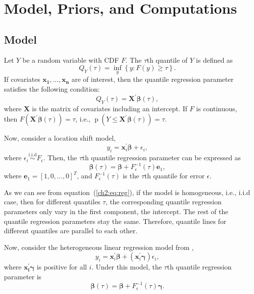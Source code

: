 \documentclass[12pt]{article}
\DeclareMathOperator{\pr}{p}
\begin{document}
\section{Model, Priors, and Computations}
\label{ch2:sec:model}
\subsection{Model}
Let $Y$ be a random variable with CDF $F$.  The $\tau$th quantile of
$Y$ is defined as
\begin{displaymath}
  Q_Y(\tau) = \underset{y}{\inf} \left\{ y: F(y) \ge \tau \right\}.
\end{displaymath}
If covariates $\bm{x_1, \ldots, x_n}$ are of interest, then the
quantile regression parameter satisfies the following condition:
\begin{displaymath}
  Q_Y(\tau) = \bm{X^\prime\beta}(\tau),
\end{displaymath}
where $\bm{X}$ is the matrix of covariates including an intercept.  If
$F$ is continuous, then $F(\bm{X^\prime\beta}(\tau)) = \tau$, i.e., $\pr(Y
\le \bm{X^\prime\beta}(\tau)) = \tau$.

Now, consider a location shift model,
\begin{displaymath}
  y_i = \bm{x}_i^{\prime}\bm{\beta} + \epsilon_i,
\end{displaymath}
where $\epsilon_i \stackrel{\mbox{i.i.d}}{\sim} F_{\epsilon}$. Then,
the $\tau$th quantile regression parameter can be expressed as
\begin{equation} \label{ch2:eq:reg} \bm{\beta}(\tau) = \bm{\beta} +
  F^{-1}_{\epsilon}(\tau) \bm{e}_1,
\end{equation}
where $\bm{e}_1 = [1, 0, \ldots, 0]^T$, and $F^{-1}_{\epsilon}(\tau)$
is the $\tau$th quantile for error $\epsilon$.

As we can see from equation~(\ref{ch2:eq:reg}), if the model is
homogeneous, i.e., i.i.d case, then for different quantiles $\tau$,
the corresponding quantile regression parameters only vary in the
first component, the intercept. The rest of the quantile regression
parameters stay the same. Therefore, quantile lines for different
quantiles are parallel to each other.

Now, consider the heterogeneous linear regression model from
\citet{he1998},
\begin{equation}\label{ch2:eq:he}
  y_i = \bm{x}_i^{\prime}\bm{\beta} + (\bm{x}_i^{\prime}\bm{\gamma}) \epsilon_i,
\end{equation}
where $\bm{x_i^{\prime}\gamma}$ is positive for all $i$. Under this model, the
$\tau$th quantile regression parameter is
\begin{equation}\label{ch2:eq:quan}
  \bm{\beta}(\tau) = \bm{\beta} + F^{-1}_{\epsilon}(\tau) \bm{\gamma}.
\end{equation}
\end{document}
